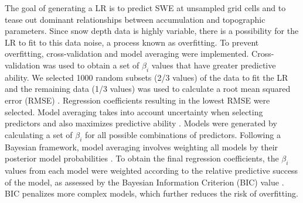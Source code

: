 \documentclass[twocolumn,letterpaper]{igs}
\begin{document}
The goal of generating a LR is to predict SWE at unsampled grid cells and to tease out dominant relationships between accumulation and topographic parameters. Since snow depth data is highly variable, there is a possibility for the LR to fit to this data noise, a process known as overfitting. To prevent overfitting, cross-validation and model averaging were implemented. Cross-validation was used to obtain a set of $\beta_i$ values that have greater predictive ability. We selected 1000 random subsets (2/3 values) of the data to fit the LR and the remaining data (1/3 values) was used to calculate a root mean squared error (RMSE) \citep{Kohavi1995}. Regression coefficients resulting in the lowest RMSE were selected. Model averaging takes into account uncertainty when selecting predictors and also maximizes predictive ability \citep{Madigan1994}. Models were generated by calculating a set of $\beta_i$ for all possible combinations of predictors. Following a Bayesian framework, model averaging involves weighting all models by their posterior model probabilities \citep{Raftery1997}. To obtain the final regression coefficients, the $\beta_i$ values from each model were weighted according to the relative predictive success of the model, as assessed by the Bayesian Information Criterion (BIC) value \citep{Burnham2004}. BIC penalizes more complex models, which further reduces the risk of overfitting.
\end{document}
